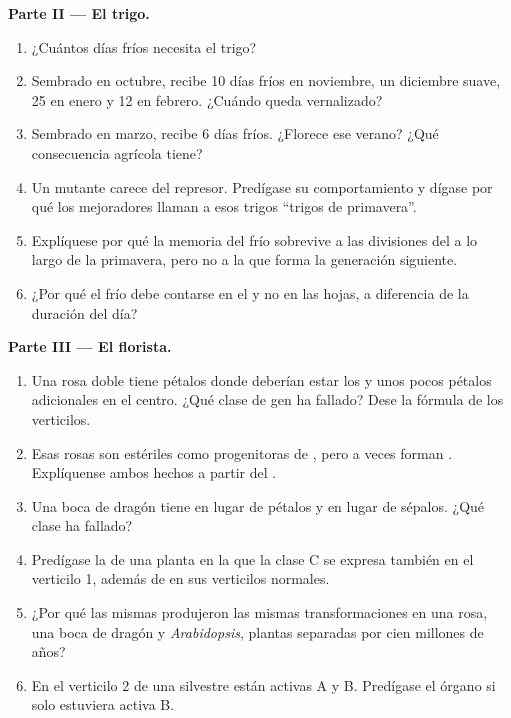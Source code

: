 \begin{problem}
\medskip
\noindent\textbf{Parte II --- El trigo.}
\begin{enumerate}[resume]
  \item ¿Cuántos días fríos necesita el trigo?
  \item Sembrado en octubre, recibe 10 días fríos en noviembre, un
        diciembre suave, 25 en enero y 12 en febrero. ¿Cuándo queda
        vernalizado?
  \item Sembrado en marzo, recibe 6 días fríos. ¿Florece ese verano? ¿Qué
        consecuencia agrícola tiene?
  \item Un mutante carece del represor. Predígase su comportamiento y
        dígase por qué los mejoradores llaman a esos trigos ``trigos de
        primavera''.
  \item Explíquese por qué la memoria del frío sobrevive a las divisiones
        del  a lo largo de la primavera, pero no a la  que
        forma la generación siguiente.
  \item ¿Por qué el frío debe contarse en el  y no en las hojas, a
        diferencia de la duración del día?
\end{enumerate}

\medskip
\noindent\textbf{Parte III --- El florista.}
\begin{enumerate}[resume]
  \item Una rosa doble tiene pétalos donde deberían estar los  y
        unos pocos pétalos adicionales en el centro. ¿Qué clase de gen ha
        fallado? Dese la fórmula de los verticilos.
  \item Esas rosas son estériles como progenitoras de , pero a veces
        forman . Explíquense ambos hechos a partir del .
  \item Una boca de dragón tiene  en lugar de pétalos y 
        en lugar de sépalos. ¿Qué clase ha fallado?
  \item Predígase la  de una planta en la que la clase C se expresa
        también en el verticilo 1, además de en sus verticilos normales.
  \item ¿Por qué las mismas  produjeron las mismas
        transformaciones en una rosa, una boca de dragón y
        \emph{Arabidopsis}, plantas separadas por cien millones de años?
  \item En el verticilo 2 de una  silvestre están activas A y B.
        Predígase el órgano si solo estuviera activa B.
\end{enumerate}


\end{problem}
